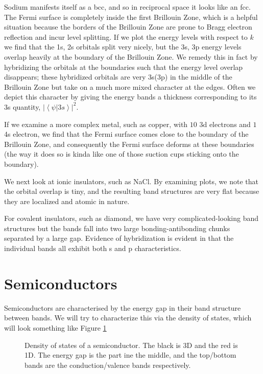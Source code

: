 \documentclass[10pt]{report}
\newcommand{\dotp}[2]{\left<#1\left.\right|#2\right>}
\newcommand{\abs}[1]{\left|#1\right|}
\begin{document}
Sodium manifests itself as a bcc, and so in reciprocal space it looks like an fcc. The Fermi surface is completely inside the first Brillouin Zone, which is a helpful situation because the borders of the Brillouin Zone are prone to Bragg electron reflection and incur level splitting. If we plot the energy levels with respect to $k$ we find that the 1s, 2s orbitals split very nicely, but the 3s, 3p energy levels overlap heavily at the boundary of the Brillouin Zone. We remedy this in fact by hybridizing the orbitals at the boundaries such that the energy level overlap disappears; these hybridized orbitals are very 3s(3p) in the middle of the Brillouin Zone but take on a much more mixed character at the edges. Often we depict this character by giving the energy bands a thickness corresponding to its 3s quantity, $\abs{\dotp{\psi}{3s}}^2$.

If we examine a more complex metal, such as copper, with $10$ 3d electrons and $1$ 4s electron, we find that the Fermi surface comes close to the boundary of the Brillouin Zone, and consequently the Fermi surface deforms at these boundaries (the way it does so is kinda like one of those suction cups sticking onto the boundary).

We next look at ionic insulators, such as NaCl. By examining plots, we note that the orbital overlap is tiny, and the resulting band structures are very flat because they are localized and atomic in nature.

For covalent insulators, such as diamond, we have very complicated-looking band structures but the bands fall into two large bonding-antibonding chunks separated by a large gap. Evidence of hybridization is evident in that the individual bands all exhibit both s and p characteristics.

\section{Semiconductors}

Semiconductors are characterised by the energy gap in their band structure between bands. We will try to characterize this via the density of states, which will look something like Figure \ref{15.10.DoS}
\begin{figure}[!h]
    \centering
    \caption{Density of states of a semiconductor. The black is 3D and the red is 1D. The energy gap is the part ine the middle, and the top/bottom bands are the conduction/valence bands respectively.}
    \label{15.10.DoS}
\end{figure}
\end{document}
